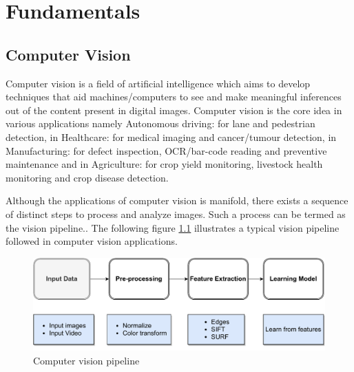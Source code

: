 



\chapter{Fundamentals}
\label{sec:fundamentals}



\section{Computer Vision}
\label{sec:fundamentals:sec1}

Computer vision is a field of artificial intelligence which aims to develop techniques that aid machines/computers to see and make meaningful inferences out of the content present in digital images.
Computer vision is the core idea in various applications namely Autonomous driving: for lane and pedestrian detection, in Healthcare: for medical imaging and cancer/tumour detection, in Manufacturing: for defect inspection, OCR/bar-code reading and preventive maintenance and in Agriculture: for crop yield monitoring, livestock health monitoring and crop disease detection.

Although the applications of computer vision is manifold, there exists a sequence of distinct steps to process and analyze images. Such a process can be termed as the vision pipeline.\cite{WEB:manning}. The following figure \ref{fig:fundamentals:example1} illustrates a typical vision pipeline followed in computer vision applications.

% 	
\begin{figure}[h]
	\includegraphics[width=\textwidth]{content/imgs/cv-pipeline.drawio.pdf}
	\caption{Computer vision pipeline}
	\label{fig:fundamentals:example1}
\end{figure}

